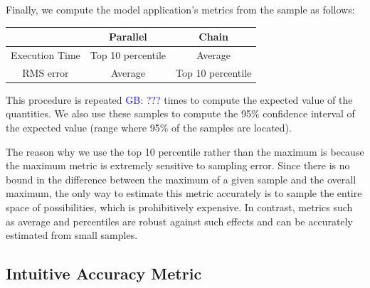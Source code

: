 \documentclass[10pt, conference, compsocconf]{IEEEtran}
\newcommand{\greg}[1]{%
  \textcolor{blue}{GB: #1}
}
\begin{document}
Finally, we compute the model application's metrics from the sample as follows:
\begin{tabular}{|c|c|c|}
\hline
               & Parallel          & Chain             \\
\hline
Execution Time & Top 10 percentile & Average           \\
\hline
RMS error      & Average           & Top 10 percentile \\
\hline
\end{tabular}
This procedure is repeated \greg{???} times to compute the expected value of the quantities.
We also use these samples to compute the 95\% confidence interval of the expected value (range where 95\% of the samples are located).

The reason why we use the top 10 percentile rather than the maximum is because the maximum metric is extremely sensitive to sampling error.
Since there is no bound in the difference between the maximum of a given sample and the overall maximum, the only way to estimate this metric accurately is to sample the entire space of possibilities, which is prohibitively expensive.
In contrast, metrics such as average and percentiles are robust against such effects and can be accurately estimated from small samples.

\subsection{Intuitive Accuracy Metric}
\label{sec:eval:errorsensitivity}
\end{document}
